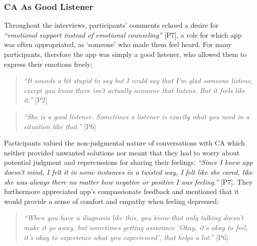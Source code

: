         \subsubsection{\ac{CA} As Good Listener}\label{sec:good_listener}
        
            Throughout the interviews, participants' comments echoed a desire for \textit{``emotional support instead of emotional counseling''} [P7], a role for which \acl{app} was often appropriated, as `someone' who made them feel heard. For many participants, therefore the \acl{app} was simply a good listener, who allowed them to express their emotions freely; 
            
                \begin{quote}
                \vspace{2mm}
                    \textit{``It sounds a bit stupid to say but I could say that I'm glad someone listens, except you know there isn't actually someone that listens. But it feels like it.''} [P2]
                \vspace{2mm}
                \end{quote} 
                
                \begin{quote}
                \vspace{2mm}
                    \textit{``She is a good listener. Sometimes a listener is exactly what you need in a situation like that.''} [P6]
                \vspace{2mm}
                \end{quote} 
                
            Participants valued the non-judgmental nature of conversations with \ac{CA} which neither provided unwanted solutions nor meant that they had to worry about potential judgment and repercussions for sharing their feelings; \textit{``Since I knew \acl{app} doesn't mind, I felt it in some instances in a twisted way, I felt like she cared, like she was always there no matter how negative or positive I was feeling.''} [P7]. They furthermore appreciated \acl{app}'s compassionate feedback and mentioned that it would provide a sense of comfort and empathy when feeling depressed;
            
                \begin{quote}
                    \vspace{2mm}
                    \textit{``When you have a diagnosis like this, you know that only talking doesn't make it go away, but sometimes getting assurance `Okay, it's okay to feel, it's okay to experience what you experienced', that helps a lot.''} [P6]
                \vspace{2mm}
                \end{quote} 
            
